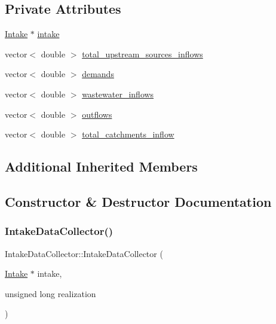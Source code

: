 \subsection*{Private Attributes}
\begin{DoxyCompactItemize}
\item 
\mbox{\hyperlink{classIntake}{Intake}} $\ast$ \mbox{\hyperlink{classIntakeDataCollector_a0dfbf640d99394bb82413c9a116db19b_a0dfbf640d99394bb82413c9a116db19b}{intake}}
\item 
vector$<$ double $>$ \mbox{\hyperlink{classIntakeDataCollector_a5016d2fece2ef545f72b9fa22497c817_a5016d2fece2ef545f72b9fa22497c817}{total\+\_\+upstream\+\_\+sources\+\_\+inflows}}
\item 
vector$<$ double $>$ \mbox{\hyperlink{classIntakeDataCollector_a7d1d205c15423db421038e54ac0e1f36_a7d1d205c15423db421038e54ac0e1f36}{demands}}
\item 
vector$<$ double $>$ \mbox{\hyperlink{classIntakeDataCollector_a4485bea7a536f9fde233a2cc37200ec6_a4485bea7a536f9fde233a2cc37200ec6}{wastewater\+\_\+inflows}}
\item 
vector$<$ double $>$ \mbox{\hyperlink{classIntakeDataCollector_ae0b0d07123dd9323402ca55e12802ac8_ae0b0d07123dd9323402ca55e12802ac8}{outflows}}
\item 
vector$<$ double $>$ \mbox{\hyperlink{classIntakeDataCollector_aea2dbea83bb83c26df4474da669dd2eb_aea2dbea83bb83c26df4474da669dd2eb}{total\+\_\+catchments\+\_\+inflow}}
\end{DoxyCompactItemize}
\subsection*{Additional Inherited Members}


\subsection{Constructor \& Destructor Documentation}
\mbox{\label{classIntakeDataCollector_a2ab4a81bec74a370c60c78609627e807_a2ab4a81bec74a370c60c78609627e807}} 
\subsubsection{\texorpdfstring{Intake\+Data\+Collector()}{IntakeDataCollector()}}
{\footnotesize\ttfamily Intake\+Data\+Collector\+::\+Intake\+Data\+Collector (\begin{DoxyParamCaption}\item[{\mbox{\hyperlink{classIntake}{Intake}} $\ast$}]{intake,  }\item[{unsigned long}]{realization }\end{DoxyParamCaption})}




